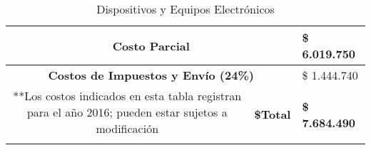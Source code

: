 \begin{table}[tb]
\begin{center}
{{\begin{tabular}{p{2cm} p{5cm} p{2cm} p{2cm} p{2cm} p{3cm}}
			\hline
			\multicolumn{5}{c}{\textbf{Costo Parcial}}							& \$ 6.019.750\\
			\hline	
			\multicolumn{5}{c}{\multirow{1}{*}{\textbf{Costos de Impuestos y Envío  (24\%)}}} 	& \$ 1.444.740\\
			\hline
			\multicolumn{4}{c}{**Los costos indicados en esta tabla registran para el año 2016; pueden estar sujetos a modificación} & \multirow{2}{*}{\textbf{\$Total}} &             \multirow{2}{*}{\textbf{\$ 7.684.490}} \\
			\multicolumn{6}{c}{} \\ 
			\hline
		    \end{tabular}%
        }
	}
	\end{center}
	
	\caption{Dispositivos y Equipos  Electrónicos}
	\label{Tabla1}
\end{table}